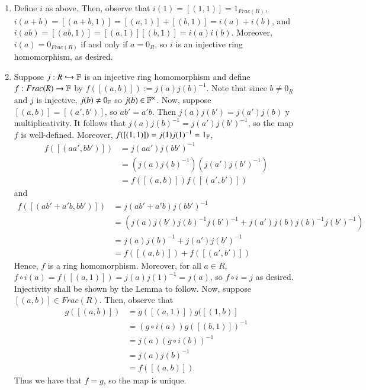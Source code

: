 \documentclass[12pt, a4paper, twoside, openright, titlepage]{book}
\begin{document}
\begin{proof*}{}{}
    \begin{enumerate}
        \item Define $i$ as above. Then, observe that $i(1) = [(1,1)] = 1_{Frac(R)}$, $i(a+b) = [(a+b,1)] = [(a,1)] + [(b,1)] = i(a) + i(b)$, and $i(ab) = [(ab,1)] = [(a,1)][(b,1)] = i(a)i(b)$. Moreover, $i(a) = 0_{Frac(R)}$ if and only if $a = 0_R$, so $i$ is an injective ring homomorphism, as desired.
        \item Suppose $j:R\hookrightarrow \mathbb F$ is an injective ring homomorphism and define $f:Frac(R) \rightarrow \mathbb F$ by $f([(a,b)]) := j(a)j(b)^{-1}$. Note that since $b \neq 0_R$ and $j$ is injective, $j(b) \neq 0_{\mathbb F}$ so $j(b) \in \mathbb F^{\times}$. Now, suppose $[(a,b)] = [(a',b')]$, so $ab' = a'b$. Then $j(a)j(b') = j(a')j(b)$ y multiplicativity. It follows that $j(a)j(b)^{-1} = j(a')j(b')^{-1}$, so the map $f$ is well-defined. Moreover, $f([(1,1)]) = j(1)j(1)^{-1} = 1_{\mathbb F}$, \begin{align*}
            f([(aa',bb')]) &= j(aa')j(bb')^{-1} \\
            &= (j(a)j(b)^{-1})(j(a')j(b')^{-1}) \\
            &= f([(a,b)])f([(a',b')])
        \end{align*}
        and \begin{align*}
            f([(ab' + a'b,bb')]) &= j(ab'+a'b)j(bb')^{-1} \\
            &= (j(a)j(b')j(b)^{-1}j(b')^{-1}+j(a')j(b)j(b)^{-1}j(b')^{-1}) \\
            &= j(a)j(b)^{-1} + j(a')j(b')^{-1} \\
            &= f([(a,b)])+f([(a',b')])
        \end{align*}
        Hence, $f$ is a ring homomorphism. Moreover, for all $a \in R$, $f\circ i(a) = f([(a,1)]) = j(a)j(1)^{-1} = j(a)$, so $f\circ i = j$ as desired. Injectivity shall be shown by the Lemma to follow. Now, suppose $[(a,b)] \in Frac(R)$. Then, observe that \begin{align*}
            g([(a,b)]) &= g([(a,1)])g([(1,b)] \tag{by multiplicativity} \\
            &= (g\circ i(a))g([(b,1)])^{-1} \tag{by multiplicativity and $b \neq 0$} \\
            &= j(a)(g\circ i(b))^{-1} \\
            &= j(a)j(b)^{-1} \\
            &= f([(a,b)]) \tag{by definition}
        \end{align*}
        Thus we have that $f = g$, so the map is unique.
    \end{enumerate}
\end{proof*}
\end{document}
